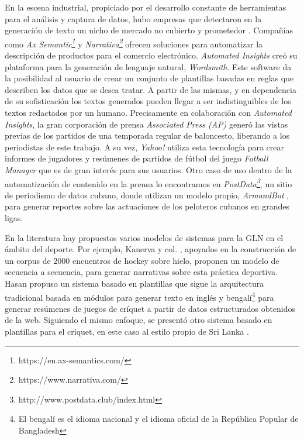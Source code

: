     En la escena industrial, propiciado por el desarrollo constante de herramientas para el análisis y captura de datos,
hubo empresas que detectaron en la generación de texto un nicho de mercado no cubierto y prometedor . Compañías como \textit{Ax Semantic\footnote[1]{https://en.ax-semantics.com/}} y 
\textit{Narrativa\footnote[2]{https://www.narrativa.com/}} ofrecen soluciones para automatizar la descripción de productos para el comercio electrónico. 
\textit{Automated Insights} creó su plataforma para la generación de lenguaje natural, \textit{Wordsmith}. Este software da la posibilidad al usuario de crear un conjunto 
de plantillas basadas en reglas que describen los datos que se desea tratar. A partir de las mismas, y en dependencia de su sofisticación los textos generados pueden llegar a ser 
indistinguibles de los textos redactados por un humano. Precisamente en colaboración con \textit{Automated Insights}, la gran corporación de prensa \textit{Associated Press (AP)} generó
las vistas previas de los partidos de una temporada regular de baloncesto, liberando a los periodistas de este trabajo. A su vez, \textit{Yahoo!} utiliza esta tecnología para crear informes 
de jugadores y resúmenes de partidos de fútbol del juego \textit{Fotball Manager} que es de gran interés para sus usuarios. Otro caso de uso dentro de la automatización de contenido en la prensa lo encontramos en
\textit{PostData\footnote[3]{http://www.postdata.club/index.html}}, un sitio de periodismo 
de datos cubano, donde utilizan un modelo propio, \textit{ArmandBot} , para generar reportes sobre las actuaciones de los peloteros cubanos en grandes ligas.

    En la literatura hay propuestos varios modelos de sistemas para la GLN en el ámbito del deporte. Por ejemplo, Kanerva y col. , apoyados en la construcción de un corpus de 2000 encuentros de hockey sobre hielo, 
proponen un modelo de secuencia a secuencia, para generar narrativas sobre esta práctica deportiva. Hasan  propuso un sistema basado en plantillas que sigue la arquitectura tradicional basada en módulos para 
generar texto en inglés y bengalí\footnote[5]{El bengalí es el idioma nacional y el idioma oficial de la República Popular de Bangladesh} para generar resúmenes de juegos de críquet a partir de datos estructurados obtenidos de la web. 
Siguiendo el mismo enfoque, se presentó otro sistema basado en plantillas para el críquet, en este caso al estilo propio de Sri Lanka .
 
